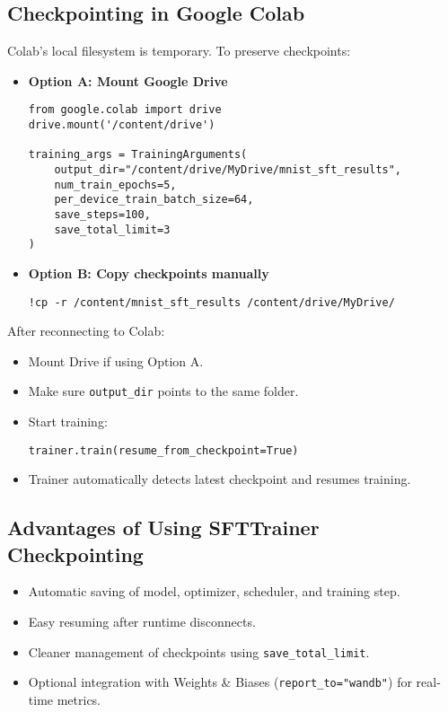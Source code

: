 \documentclass[a4paper, 12pt]{article}
\begin{document}
\subsection*{Checkpointing in Google Colab}
Colab's local filesystem is temporary. To preserve checkpoints:
\begin{tcolorbox}[colback=blue!5!white, colframe=blue!75!black, title=Resume Training in Colab]
\begin{itemize}
    \item \textbf{Option A: Mount Google Drive}
    
    \begin{verbatim}
from google.colab import drive
drive.mount('/content/drive')

training_args = TrainingArguments(
    output_dir="/content/drive/MyDrive/mnist_sft_results",
    num_train_epochs=5,
    per_device_train_batch_size=64,
    save_steps=100,
    save_total_limit=3
)
    \end{verbatim}
    \item \textbf{Option B: Copy checkpoints manually}
    \begin{verbatim}
!cp -r /content/mnist_sft_results /content/drive/MyDrive/
    \end{verbatim}
\end{itemize}
\end{tcolorbox}

\begin{tcolorbox}[colback=blue!5!white, colframe=blue!75!black, title=Resume Training in Colab]
After reconnecting to Colab:
\begin{itemize}
    \item Mount Drive if using Option A.
    \item Make sure \texttt{output\_dir} points to the same folder.
    \item Start training:
\begin{verbatim}
trainer.train(resume_from_checkpoint=True)
\end{verbatim}
    \item Trainer automatically detects latest checkpoint and resumes training.
\end{itemize}
\end{tcolorbox}

\subsection*{Advantages of Using SFTTrainer Checkpointing}
\begin{itemize}
    \item Automatic saving of model, optimizer, scheduler, and training step.
    \item Easy resuming after runtime disconnects.
    \item Cleaner management of checkpoints using \texttt{save\_total\_limit}.
    \item Optional integration with Weights \& Biases (\texttt{report\_to="wandb"}) for real-time metrics.
\end{itemize}
\end{document}
